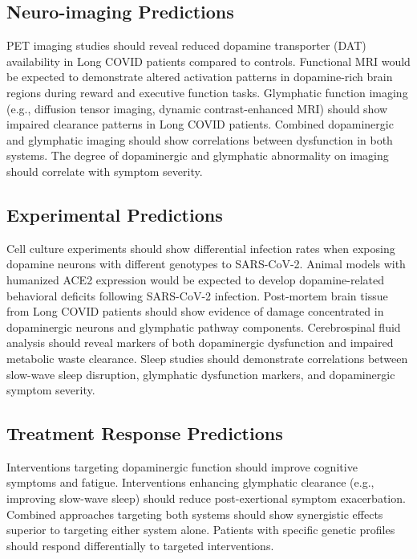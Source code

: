 \documentclass[12pt]{article}
\begin{document}
\subsection*{Neuro-imaging Predictions}

PET imaging studies should reveal reduced dopamine transporter (DAT) availability in Long COVID patients compared to controls. Functional MRI would be expected to demonstrate altered activation patterns in dopamine-rich brain regions during reward and executive function tasks. Glymphatic function imaging (e.g., diffusion tensor imaging, dynamic contrast-enhanced MRI) should show impaired clearance patterns in Long COVID patients. Combined dopaminergic and glymphatic imaging should show correlations between dysfunction in both systems. The degree of dopaminergic and glymphatic abnormality on imaging should correlate with symptom severity.

\subsection*{Experimental Predictions}

Cell culture experiments should show differential infection rates when exposing dopamine neurons with different genotypes to SARS-CoV-2. Animal models with humanized ACE2 expression would be expected to develop dopamine-related behavioral deficits following SARS-CoV-2 infection. Post-mortem brain tissue from Long COVID patients should show evidence of damage concentrated in dopaminergic neurons and glymphatic pathway components. Cerebrospinal fluid analysis should reveal markers of both dopaminergic dysfunction and impaired metabolic waste clearance. Sleep studies should demonstrate correlations between slow-wave sleep disruption, glymphatic dysfunction markers, and dopaminergic symptom severity.

\subsection*{Treatment Response Predictions}

Interventions targeting dopaminergic function should improve cognitive symptoms and fatigue. Interventions enhancing glymphatic clearance (e.g., improving slow-wave sleep) should reduce post-exertional symptom exacerbation. Combined approaches targeting both systems should show synergistic effects superior to targeting either system alone. Patients with specific genetic profiles should respond differentially to targeted interventions.
\end{document}
